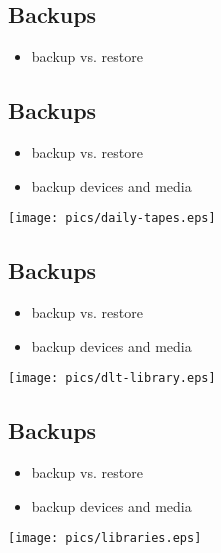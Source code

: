 \documentclass[xga]{xdvislides}
\begin{document}
\subsection{Backups}
\begin{itemize}
	\item backup vs. restore
\end{itemize}

\subsection{Backups}
\begin{itemize}
	\item backup vs. restore
	\item backup devices and media
\end{itemize}
\vspace*{\fill}
\begin{center}
	\texttt{[image: pics/daily-tapes.eps]}
\end{center}
\vspace*{\fill}

\subsection{Backups}
\begin{itemize}
	\item backup vs. restore
	\item backup devices and media
\end{itemize}
\vspace*{\fill}
\begin{center}
	\texttt{[image: pics/dlt-library.eps]}
\end{center}
\vspace*{\fill}

\subsection{Backups}
\begin{itemize}
	\item backup vs. restore
	\item backup devices and media
\end{itemize}
\vspace*{\fill}
\begin{center}
	\texttt{[image: pics/libraries.eps]}
\end{center}
\vspace*{\fill}
\end{document}
